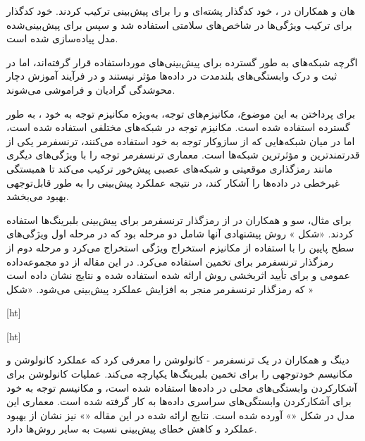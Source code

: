  هان و همکاران در ، خود کدگذار پشته‌ای و  را برای پیش‌بینی  ترکیب کردند. خود کدگذار برای ترکیب ویژگی‌ها در شاخص‌های سلامتی استفاده شد و سپس  برای پیش‌بینی‌شده مدل پیاده‌سازی شده است.
 
 
 
 اگرچه شبکه‌های  به طور گسترده برای پیش‌بینی‌های  مورداستفاده قرار گرفته‌اند، اما در ثبت و درک وابستگی‌های بلندمدت در داده‌ها مؤثر نیستند و در فرآیند آموزش دچار محوشدگی گرادیان و فراموشی می‌شوند. 
 
 برای پرداختن به این موضوع، مکانیزم‌های توجه، به‌ویژه مکانیزم توجه به خود ، به طور گسترده استفاده شده است. مکانیزم توجه در شبکه‌های مختلفی استفاده شده است، اما در میان شبکه‌هایی که از سازوکار توجه به خود استفاده می‌کنند، ترنسفرمر یکی از قدرتمندترین و مؤثرترین شبکه‌ها است. معماری ترنسفرمر توجه را با ویژگی‌های دیگری مانند رمزگذاری موقعیتی و شبکه‌های عصبی پیش‌خور ترکیب می‌کند تا همبستگی غیرخطی در داده‌ها را آشکار کند، در نتیجه عملکرد پیش‌بینی را به طور قابل‌توجهی بهبود می‌بخشد.




برای مثال، سو و همکاران در  از رمزگذار ترنسفرمر برای پیش‌بینی  بلبرینگ‌ها استفاده کردند. «شکل » روش پیشنهادی آنها شامل دو مرحله بود که در مرحله اول ویژگی‌های سطح پایین را با استفاده از مکانیزم استخراج ویژگی استخراج می‌کرد و مرحله دوم از رمزگذار ترنسفرمر برای تخمین  استفاده می‌کرد. در این مقاله از دو مجموعه‌داده عمومی  و  برای تأیید اثربخشی روش ارائه شده استفاده شده و نتایج نشان داده است که رمزگذار ترنسفرمر منجر به افزایش عملکرد پیش‌بینی می‌شود. «شکل »



[ht]



[ht]



دینگ و همکاران در  یک ترنسفرمر - کانولوشن را معرفی کرد که عملکرد کانولوشن و مکانیسم خودتوجهی را برای تخمین  بلبرینگ‌ها یکپارچه می‌کند. عملیات کانولوشن برای آشکارکردن وابستگی‌های محلی در داده‌ها استفاده شده است، و مکانیسم توجه به خود برای آشکارکردن وابستگی‌های سراسری داده‌ها به کار گرفته شده است. معماری این مدل در شکل «» آورده شده است. نتایج ارائه شده در این مقاله «» نیز نشان از بهبود عملکرد و کاهش خطای پیش‌بینی نسبت به سایر روش‌ها دارد.




